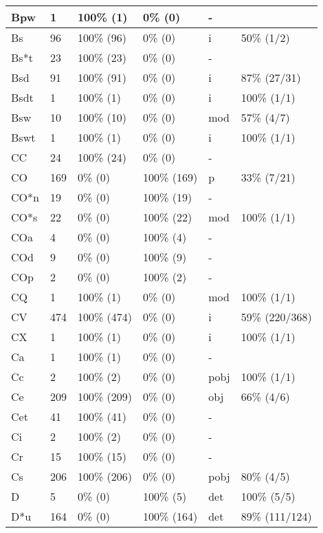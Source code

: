 \begin{figure*}
\begin{tabular}{|l|l|l|l||l|l|}
\hline
 Bpw & 1 & 100\% (1) & 0\% (0) & - &  \\ 
\hline
 Bs & 96 & 100\% (96) & 0\% (0) & i & 50\% (1/2) \\ 
\hline
 Bs*t & 23 & 100\% (23) & 0\% (0) & - &  \\ 
\hline
 Bsd & 91 & 100\% (91) & 0\% (0) & i & 87\% (27/31) \\ 
\hline
 Bsdt & 1 & 100\% (1) & 0\% (0) & i & 100\% (1/1) \\ 
\hline
 Bsw & 10 & 100\% (10) & 0\% (0) & mod & 57\% (4/7) \\ 
\hline
 Bswt & 1 & 100\% (1) & 0\% (0) & i & 100\% (1/1) \\ 
\hline
 CC & 24 & 100\% (24) & 0\% (0) & - &  \\ 
\hline
 CO & 169 & 0\% (0) & 100\% (169) & p & 33\% (7/21) \\ 
\hline
 CO*n & 19 & 0\% (0) & 100\% (19) & - &  \\ 
\hline
 CO*s & 22 & 0\% (0) & 100\% (22) & mod & 100\% (1/1) \\ 
\hline
 COa & 4 & 0\% (0) & 100\% (4) & - &  \\ 
\hline
 COd & 9 & 0\% (0) & 100\% (9) & - &  \\ 
\hline
 COp & 2 & 0\% (0) & 100\% (2) & - &  \\ 
\hline
 CQ & 1 & 100\% (1) & 0\% (0) & mod & 100\% (1/1) \\ 
\hline
 CV & 474 & 100\% (474) & 0\% (0) & i & 59\% (220/368) \\ 
\hline
 CX & 1 & 100\% (1) & 0\% (0) & i & 100\% (1/1) \\ 
\hline
 Ca & 1 & 100\% (1) & 0\% (0) & - &  \\ 
\hline
 Cc & 2 & 100\% (2) & 0\% (0) & pobj & 100\% (1/1) \\ 
\hline
 Ce & 209 & 100\% (209) & 0\% (0) & obj & 66\% (4/6) \\ 
\hline
 Cet & 41 & 100\% (41) & 0\% (0) & - &  \\ 
\hline
 Ci & 2 & 100\% (2) & 0\% (0) & - &  \\ 
\hline
 Cr & 15 & 100\% (15) & 0\% (0) & - &  \\ 
\hline
 Cs & 206 & 100\% (206) & 0\% (0) & pobj & 80\% (4/5) \\ 
\hline
 D & 5 & 0\% (0) & 100\% (5) & det & 100\% (5/5) \\ 
\hline
 D*u & 164 & 0\% (0) & 100\% (164) & det & 89\% (111/124) \\ 
\hline
\end{tabular}
\end{figure*}
